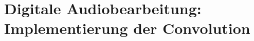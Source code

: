 \chapter{Digitale Audiobearbeitung: Implementierung der Convolution}
\label{chapt:implementation}


